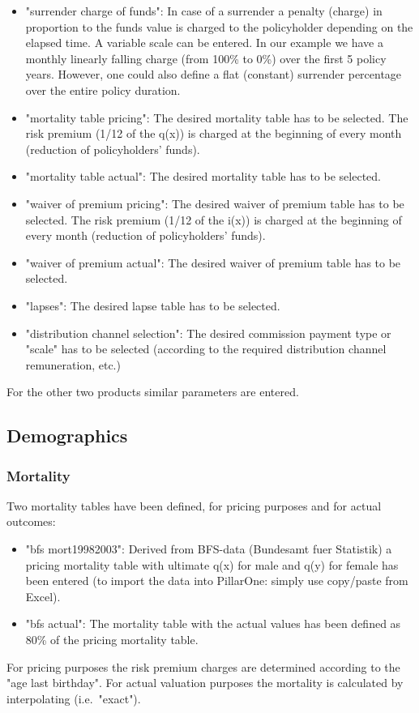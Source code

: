\begin{itemize}
	\item "surrender charge of funds": In case of a surrender a penalty (charge) in proportion to the funds value is charged to the policyholder depending on the elapsed time. A variable scale can be entered. In our example we have a monthly linearly falling charge (from 100\% to 0\%) over the first 5 policy years. However, one could also define a flat (constant) surrender percentage over the entire policy duration.
	\item "mortality table pricing": The desired mortality table has to be selected. The risk premium (1/12 of the q(x)) is charged at the beginning of every month (reduction of policyholders' funds).
	\item "mortality table actual": The desired mortality table has to be selected.
	\item "waiver of premium pricing": The desired waiver of premium table has to be selected. The risk premium (1/12 of the i(x)) is charged at the beginning of every month (reduction of policyholders' funds).
	\item "waiver of premium actual": The desired waiver of premium table has to be selected.
	\item "lapses": The desired lapse table has to be selected.
	\item "distribution channel selection": The desired commission payment type or "scale" has to be selected (according to the required distribution channel remuneration, etc.) 
\end{itemize}

For the other two products similar parameters are entered.

\subsection{Demographics}

\subsubsection{Mortality}

Two mortality tables have been defined, for pricing purposes and for actual outcomes:	
\begin{itemize}
	\item "bfs mort19982003": Derived from BFS-data (Bundesamt fuer Statistik) a pricing mortality table with ultimate q(x) for male and q(y) for female has been entered (to import the data into PillarOne: simply use copy/paste from Excel).
	\item "bfs actual": The mortality table with the actual values has been defined as 80\% of the pricing mortality table.
\end{itemize}
For pricing purposes the risk premium charges are determined according to the "age last birthday". For actual valuation purposes the mortality is calculated by interpolating (i.e.~"exact").

